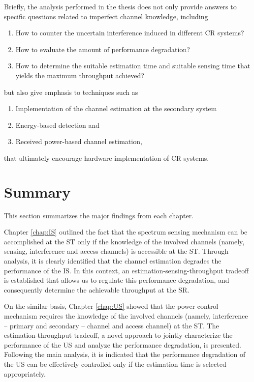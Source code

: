 Briefly, the analysis performed in the thesis does not only provide answers to specific questions related to imperfect channel knowledge, including 
\begin{enumerate} \item How to counter the uncertain interference induced in different CR systems? \item How to evaluate the amount of performance degradation? \item How to determine the suitable estimation time and suitable sensing time that yields the maximum throughput achieved? \end{enumerate}
but also give emphasis to techniques such as \begin{enumerate} \item Implementation of the channel estimation at the secondary system \item Energy-based detection and \item Received power-based channel estimation, \end{enumerate} that ultimately encourage hardware implementation of CR systems. 


\section{Summary}
This section summarizes the major findings from each chapter. 

Chapter \ref{chap:IS} outlined the fact that the spectrum sensing mechanism can be accomplished at the ST only if the knowledge of the involved channels (namely, sensing, interference and access channels) is accessible at the ST. Through analysis, it is clearly identified that the channel estimation degrades the performance of the IS. In this context, an estimation-sensing-throughput tradeoff is established that allows us to regulate this performance degradation, and consequently determine the achievable throughput at the SR.

On the similar basis, Chapter \ref{chap:US} showed that the power control mechanism requires the knowledge of the involved channels (namely, interference -- primary and secondary -- channel and access channel) at the ST. The estimation-throughput tradeoff, a novel approach to jointly characterize the performance of the US and analyze the performance degradation, is presented. Following the main analysis, it is indicated that the performance degradation of the US can be effectively controlled only if the estimation time is selected appropriately.   

